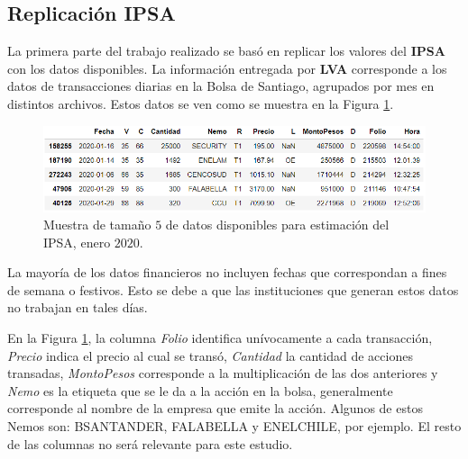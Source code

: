 \documentclass{article}
\begin{document}
\subsection{Replicación IPSA}
   	La primera parte del trabajo realizado se basó en replicar los valores del \textbf{IPSA} con los datos disponibles. La información entregada por \textbf{LVA} corresponde a los datos de transacciones diarias en la Bolsa de Santiago, agrupados por mes en distintos archivos. 
    Estos datos se ven como se muestra en la Figura \ref{fig:trans}.
   	\begin{figure}[H]
   		\centering
   		\includegraphics[scale=.5]{imgs/transacciones_RV_data.png}
   		\caption{Muestra de tamaño $5$ de datos disponibles para estimación del IPSA, enero $2020$.}
   		\label{fig:trans}
   	\end{figure}
   \begin{remark}
   	La mayoría de los datos financieros no incluyen fechas que correspondan a fines de semana o festivos. Esto se debe a que las instituciones que generan estos datos no trabajan en tales días.
   \end{remark}
   	En la Figura \ref{fig:trans}, la columna \textit{Folio} identifica unívocamente a cada transacción, \textit{Precio} indica el precio al cual se transó,  \textit{Cantidad} la cantidad de acciones transadas, \textit{MontoPesos} corresponde a la multiplicación de las dos anteriores y \textit{Nemo} es la etiqueta que se le da a la acción en la bolsa, generalmente corresponde al nombre de la empresa que emite la acción. Algunos de estos Nemos son: BSANTANDER, FALABELLA y ENELCHILE, por ejemplo. El resto de las columnas no será relevante para este estudio.\\
   	
\end{document}
